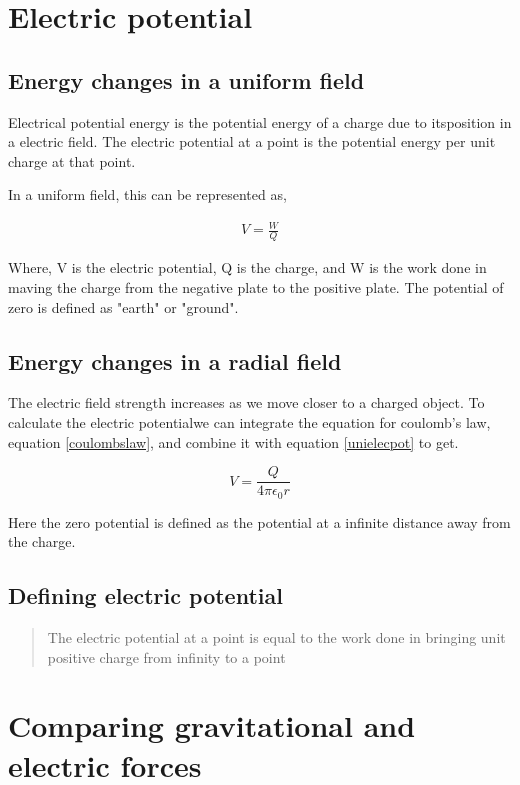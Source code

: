 \documentclass{scrbook}
\begin{document}
\section{Electric potential}

\subsection{Energy changes in a uniform field}

	Electrical potential energy is the potential energy of a charge due to itsposition in a electric field. The electric potential at a point is the potential energy per unit charge at that point.

	In a uniform field, this can be represented as,

	\begin{align}
		V = \frac{W}{Q} \label{unielecpot}
	\end{align}
	
	Where, V is the electric potential, Q is the charge, and W is the work done in maving the charge from the negative plate to the positive plate. The potential of zero is defined as "earth" or "ground".

\subsection{Energy changes in a radial field}

	The electric field strength increases as we move closer to a charged object. To calculate the electric potentialwe can integrate the equation for coulomb's law, equation \ref{coulombslaw}, and combine it with equation \ref{unielecpot} to get.

	\[ V = \frac{Q}{4\pi \epsilon_0 r} \]

	Here the zero potential is defined as the potential at a infinite distance away from the charge.

\subsection{Defining electric potential}

	\begin{quote}
		The electric potential at a point is equal to the work done in bringing unit positive charge from infinity to a point
	\end{quote}

\section{Comparing gravitational and electric forces}
\end{document}

